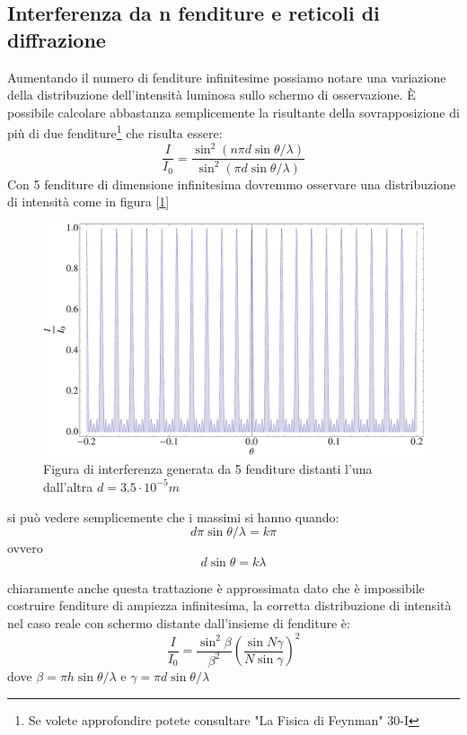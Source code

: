 \documentclass[a4paper,10pt,oneside]{article}
\begin{document}
\subsection*{Interferenza da n fenditure e reticoli di diffrazione}

Aumentando il numero di fenditure infinitesime possiamo notare una variazione della distribuzione dell'intensità luminosa sullo schermo di osservazione. È possibile calcolare abbastanza semplicemente la risultante della sovrapposizione di più di due fenditure\footnote{Se volete approfondire potete consultare "La Fisica di Feynman" 30-I} che risulta essere:
\begin{equation}
 \frac{I}{I_0}=\frac{\sin^2(n \pi d \sin \theta/\lambda)}{\sin^2(\pi d \sin \theta/\lambda)}
\end{equation}
Con 5 fenditure di dimensione infinitesima dovremmo osservare una distribuzione di intensità come in figura [\ref{fig:reticolo1}]
\begin{figure}[H]
 \centering
 \includegraphics[width=\textwidth]{./Immagini/reticolo1.pdf}
 \caption{Figura di interferenza generata da 5 fenditure distanti l'una dall'altra $d=3.5\cdot 10^{-5}m$}
 \label{fig:reticolo1}
\end{figure}


si può vedere semplicemente che i massimi si hanno quando:
\begin{equation}
 d\pi\sin\theta/\lambda=k\pi
\end{equation}
ovvero
\begin{equation}
 d\sin\theta=k\lambda
\end{equation}

chiaramente anche questa trattazione è approssimata dato che è impossibile costruire fenditure di ampiezza infinitesima, la corretta distribuzione di intensità nel caso reale con schermo distante dall'insieme di fenditure è:
\begin{equation}
 \frac{I}{I_0}=\frac{\sin^2 \beta}{\beta^2}\left(\frac{\sin N\gamma}{N\sin \gamma}\right)^2
\end{equation}
dove $\beta=\pi h\sin\theta/\lambda$ e $\gamma=\pi d\sin\theta/\lambda$
\end{document}
